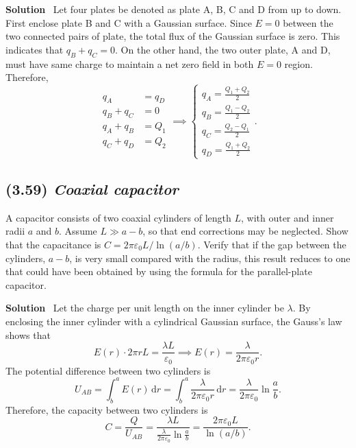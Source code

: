\documentclass[hidelinks]{article}
\begin{document}
\vspace{0.5cm}
\noindent
\textbf{Solution} \, Let four plates be denoted as plate A, B, C and D from up to down. First enclose plate B and C with a Gaussian surface. Since $E=0$ between the two connected pairs of plate, the total flux of the Gaussian surface is zero. This indicates that $q_B+q_C = 0$. On the other hand, the two outer plate, A and D, must have same charge to maintain a net zero field in both $E=0$ region. Therefore,
$$
\begin{aligned}
    q_A &= q_D \\
    q_B+q_C &= 0 \\ 
    q_A+q_B &= Q_1 \\ 
    q_C+q_D &= Q_2
\end{aligned}
\implies
\left\{
\begin{aligned}
    q_A = \frac{Q_1+Q_2}{2} \\ 
    q_B = \frac{Q_1-Q_2}{2} \\
    q_C = \frac{Q_2-Q_1}{2} \\
    q_D = \frac{Q_1+Q_2}{2} 
\end{aligned}
\right..
$$

\subsection{(3.59) \textit{Coaxial capacitor}}
A capacitor consists of two coaxial cylinders of length $L$, with outer and inner radii $a$ and $b$. Assume $L \gg a-b$, so that end corrections may be neglected. Show that the capacitance is $C=2\pi \varepsilon_0 L/ \ln(a/b)$. Verify that if the gap between the cylinders, $a-b$, is very small compared with the radius, this result reduces to one that could have been obtained by using the formula for the parallel-plate capacitor.

\vspace{0.5cm}
\noindent
\textbf{Solution} \, Let the charge per unit length on the inner cylinder be $\lambda$. By enclosing the inner cylinder with a cylindrical Gaussian surface, the Gauss's law shows that
$$E(r) \cdot 2\pi r L = \frac{\lambda L}{\varepsilon_0} \implies E(r) = \frac{\lambda}{2\pi\varepsilon_0 r}.$$
The potential difference between two cylinders is
$$U_{AB} = \int_b^a E(r) \, \mathrm{d}r = \int_b^a \frac{\lambda}{2\pi\varepsilon_0 r} \, \mathrm{d}r = \frac{\lambda}{2\pi \varepsilon_0} \ln{\frac{a}{b}}.$$
Therefore, the capacity between two cylinders is
$$C = \frac{Q}{U_{AB}} = \frac{\lambda L}{\frac{\lambda}{2\pi \varepsilon_0} \ln \frac{a}{b}} = \frac{2\pi \varepsilon_0 L}{\ln (a/b)}.$$
\end{document}
